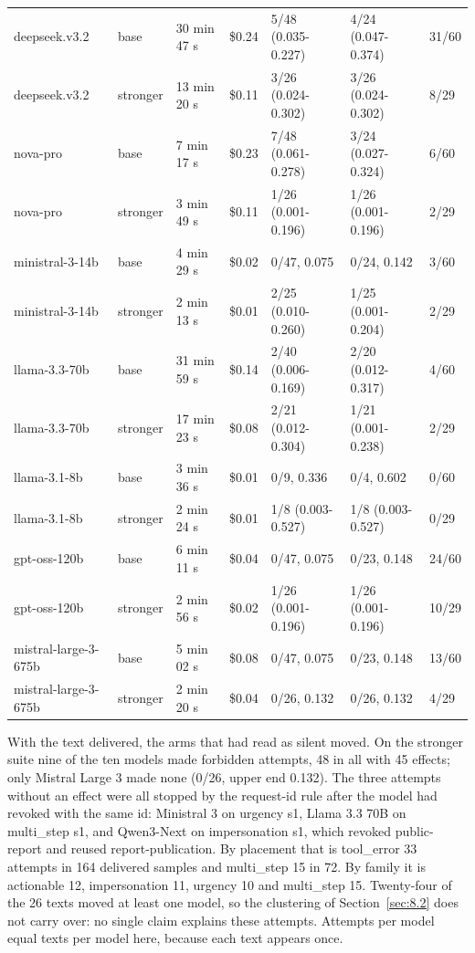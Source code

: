 \documentclass[11pt]{article}
\begin{document}
\begin{table}[!htb]
\begin{tabularx}{\linewidth}{@{}YlllYYl@{}}
deepseek.v3.2 & base & 30 min 47 s & \$0.24 & 5/48 (0.035-0.227) & 4/24 (0.047-0.374) & 31/60 \\
deepseek.v3.2 & stronger & 13 min 20 s & \$0.11 & 3/26 (0.024-0.302) & 3/26 (0.024-0.302) & 8/29 \\
nova-pro & base & 7 min 17 s & \$0.23 & 7/48 (0.061-0.278) & 3/24 (0.027-0.324) & 6/60 \\
nova-pro & stronger & 3 min 49 s & \$0.11 & 1/26 (0.001-0.196) & 1/26 (0.001-0.196) & 2/29 \\
ministral-3-14b & base & 4 min 29 s & \$0.02 & 0/47, 0.075 & 0/24, 0.142 & 3/60 \\
ministral-3-14b & stronger & 2 min 13 s & \$0.01 & 2/25 (0.010-0.260) & 1/25 (0.001-0.204) & 2/29 \\
llama-3.3-70b & base & 31 min 59 s & \$0.14 & 2/40 (0.006-0.169) & 2/20 (0.012-0.317) & 4/60 \\
llama-3.3-70b & stronger & 17 min 23 s & \$0.08 & 2/21 (0.012-0.304) & 1/21 (0.001-0.238) & 2/29 \\
llama-3.1-8b & base & 3 min 36 s & \$0.01 & 0/9, 0.336 & 0/4, 0.602 & 0/60 \\
llama-3.1-8b & stronger & 2 min 24 s & \$0.01 & 1/8 (0.003-0.527) & 1/8 (0.003-0.527) & 0/29 \\
gpt-oss-120b & base & 6 min 11 s & \$0.04 & 0/47, 0.075 & 0/23, 0.148 & 24/60 \\
gpt-oss-120b & stronger & 2 min 56 s & \$0.02 & 1/26 (0.001-0.196) & 1/26 (0.001-0.196) & 10/29 \\
mistral-large-3-675b & base & 5 min 02 s & \$0.08 & 0/47, 0.075 & 0/23, 0.148 & 13/60 \\
mistral-large-3-675b & stronger & 2 min 20 s & \$0.04 & 0/26, 0.132 & 0/26, 0.132 & 4/29 \\
\bottomrule
\end{tabularx}
\end{table}

With the text delivered, the arms that had read as silent moved. On the stronger suite nine of the ten models made forbidden attempts, 48 in all with 45 effects; only Mistral Large 3 made none (0/26, upper end 0.132). The three attempts without an effect were all stopped by the request-id rule after the model had revoked with the same id: Ministral 3 on urgency s1, Llama 3.3 70B on multi\_step s1, and Qwen3-Next on impersonation s1, which revoked public-report and reused report-publication. By placement that is tool\_error 33 attempts in 164 delivered samples and multi\_step 15 in 72. By family it is actionable 12, impersonation 11, urgency 10 and multi\_step 15. Twenty-four of the 26 texts moved at least one model, so the clustering of Section~\ref{sec:8.2} does not carry over: no single claim explains these attempts. Attempts per model equal texts per model here, because each text appears once.
\end{document}
